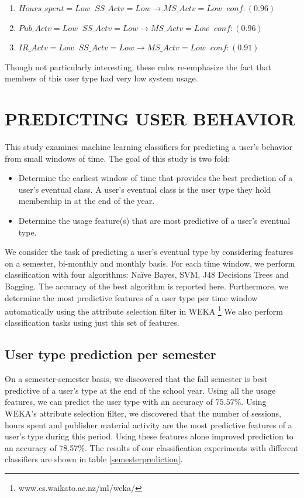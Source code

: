 \documentclass{acm_proc_article-sp}
\begin{document}
\begin{enumerate}

\item $Hours\_spent=Low \;\; SS\_Actv=Low  \longrightarrow MS\_Actv =Low  \;\;    conf:(0.96)$
\item $Pub\_Actv=Low \;\; SS\_Actv=Low  \longrightarrow MS\_Actv = Low  \;\;  conf:(0.96)$
\item $IR\_Actv=Low  \;\;SS\_Actv=Low  \longrightarrow MS\_Actv=Low  \;\; conf:(0.91)$
\end{enumerate}
Though not particularly interesting, these rules re-emphasize the fact that members of this user type had very low system usage.

 \section {PREDICTING USER BEHAVIOR}
This study examines machine learning classifiers for predicting a user's behavior from small windows of time. The goal of this study is two fold:
\begin{itemize}
\item Determine the earliest window of time that provides the best prediction of a user's eventual class. A user's eventual class is the user type they hold membership in at the end of the year.
\item Determine the usage feature(s) that are most predictive of a user's eventual type.
\end{itemize}

We consider the task of predicting a user's eventual type by considering features on a semester, bi-monthly and monthly basis.
For each time window, we perform  classification with four algorithms: Na\"ive Bayes, SVM, J48 Decisions Trees and Bagging. The accuracy of the best algorithm is reported here. Furthermore, we determine the most predictive features of a user type per time window automatically using the attribute selection filter in WEKA \footnote{www.cs.waikato.ac.nz/ml/weka/} We also perform classification tasks using just this set of features.
\subsection{User type prediction per semester}
On a semester-semester basis, we discovered that the fall semester is best predictive of a user's type at the end of the school year. Using all the usage features, we can predict the user type with an accuracy of $75.57\%$. Using WEKA's attribute selection filter, we discovered that the number of sessions, hours spent and publisher material activity are the most predictive features of a user's type during this period. Using these features alone improved prediction to an accuracy of 78.57\%. The results of our classification experiments with different classifiers are shown in table \ref{semesterprediction}.
\end{document}
